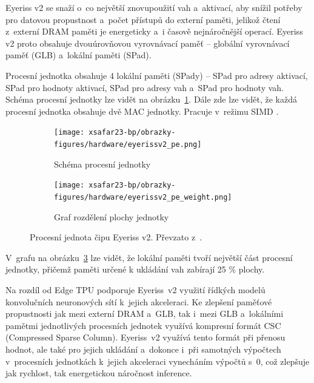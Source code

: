 Eyeriss v2 se snaží o~co největší znovupoužití vah a~aktivací, aby snížil potřeby pro datovou propustnost a~počet přístupů do externí paměti, jelikož čtení z~externí DRAM paměti je energeticky a~i časově nejnáročnější operací. Eyeriss v2 proto obsahuje dvouúrovňovou vyrovnávací paměť -- globální vyrovnávací paměť (GLB) a~lokální paměti (SPad).

Procesní jednotka obsahuje 4 lokální paměti (SPady) -- SPad pro adresy aktivací, SPad pro hodnoty aktivací, SPad pro adresy vah a~SPad pro hodnoty vah. Schéma procesní jednotky lze vidět na obrázku~\ref{fig:eyeriss_pe}. Dále zde lze vidět, že každá procesní jednotka obsahuje dvě MAC jednotky. Pracuje v~režimu SIMD \cite{8686088}.

\begin{figure}[H]
\centering
\begin{subfigure}{.85\linewidth}
\centering
\texttt{[image: xsafar23-bp/obrazky-figures/hardware/eyerissv2\_pe.png]}
\caption[short]{Schéma procesní jednotky}
\label{fig:eyeriss_pe} 
\end{subfigure}
\begin{subfigure}{.6\linewidth}
\centering
\texttt{[image: xsafar23-bp/obrazky-figures/hardware/eyerissv2\_pe\_weight.png]}
\caption[short]{Graf rozdělení plochy jednotky}
\label{fig:eyeriss_pe_weights} 
\end{subfigure}
\caption{Procesní jednota čipu Eyeriss v2. Převzato z~\cite{8686088}.}
\end{figure}

V~grafu na obrázku~\ref{fig:eyeriss_pe_weights} lze vidět, že lokální paměti tvoří největší část procesní jednotky, přičemž paměti určené k ukládání vah zabírají 25 \% plochy.

Na rozdíl od Edge TPU podporuje Eyeriss~v2 využití řídkých modelů konvolučních neuronových sítí k~jejich akceleraci. Ke zlepšení paměťové propustnosti jak mezi externí DRAM a~GLB, tak i~mezi GLB a~lokálními pamětmi jednotlivých procesních jednotek využívá kompresní formát CSC (Compressed Sparse Column). Eyeriss~v2 využívá tento formát při přenosu hodnot, ale také pro jejich ukládání a~dokonce i~při samotných výpočtech v~procesních jednotkách k~jejich akceleraci vynecháním výpočtů s~0, což zlepšuje jak rychlost, tak energetickou náročnost inference.


